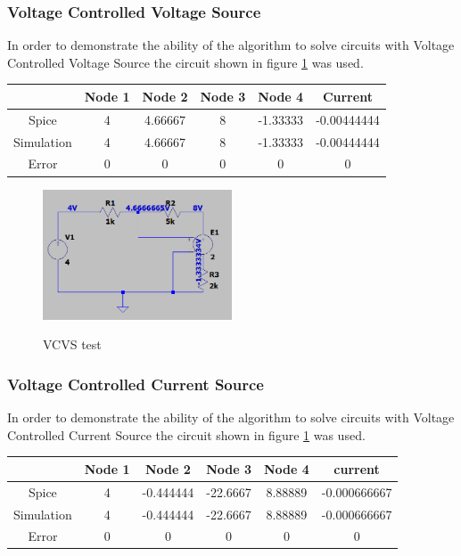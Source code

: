 \documentclass{article}
\begin{document}
\subsubsection{Voltage Controlled Voltage Source}
  In order to demonstrate the ability of the algorithm to solve circuits with Voltage Controlled Voltage Source the circuit shown in figure \ref{fig:VCCStest} was used.
\begin{center}
\begin{tabular}{ |c|c|c|c|c|c|}
\hline
 & Node 1 & Node 2 & Node 3 & Node 4 & Current\\ 
 \hline
 Spice & 4 & 4.66667 & 8 & -1.33333 & -0.00444444 \\  
 \hline
 Simulation & 4 & 4.66667 & 8 & -1.33333 & -0.00444444 \\ 
 \hline
 Error & 0 & 0 & 0 & 0 & 0\\
 \hline
\end{tabular}
\end{center}

\begin{figure}[h]
    \caption{VCVS test}
    \centering
    \includegraphics[width=0.5\textwidth]{images/VCVS_test.PNG}
    \label{fig:VCCStest}
\end{figure}

\subsubsection{Voltage Controlled Current Source}
In order to demonstrate the ability of the algorithm to solve circuits with Voltage Controlled Current Source the circuit shown in figure \ref{fig:VCCStest} was used.

\begin{center}
\begin{tabular}{ |c|c|c|c|c|c|}
\hline
 & Node 1 & Node 2 & Node 3 & Node 4 & current\\ 
 \hline
 Spice & 4 & -0.444444 & -22.6667 & 8.88889 & -0.000666667\\  
 \hline
 Simulation & 4 & -0.444444 & -22.6667 & 8.88889 & -0.000666667 \\ 
 \hline
 Error & 0 & 0 & 0 & 0 & 0\\
 \hline
\end{tabular}
\end{center}
\end{document}
